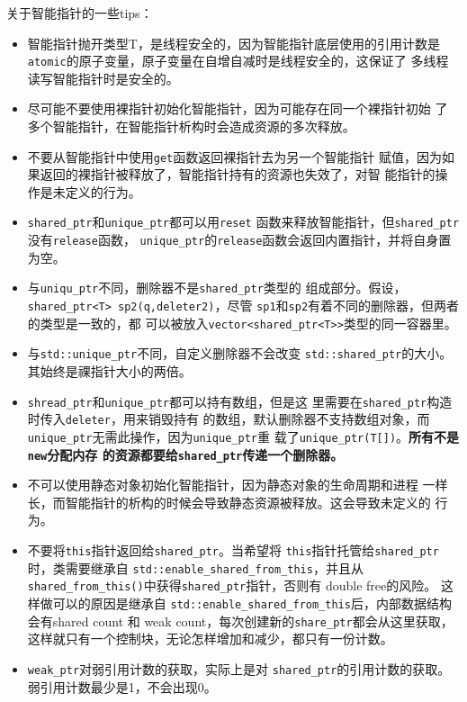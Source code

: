 关于智能指针的一些tips：
\begin{itemize}
\item 智能指针抛开类型T，是线程安全的，因为智能指针底层使用的引用计数是
\texttt{atomic}的原子变量，原子变量在自增自减时是线程安全的，这保证了
多线程读写智能指针时是安全的。
\item 尽可能不要使用裸指针初始化智能指针，因为可能存在同一个裸指针初始
  了多个智能指针，在智能指针析构时会造成资源的多次释放。
\item 不要从智能指针中使用\texttt{get}函数返回裸指针去为另一个智能指针
  赋值，因为如果返回的裸指针被释放了，智能指针持有的资源也失效了，对智
  能指针的操作是未定义的行为。
\item \texttt{shared\_ptr}和\texttt{unique\_ptr}都可以用\texttt{reset}
  函数来释放智能指针，但\texttt{shared\_ptr}没有\texttt{release}函数，
  \texttt{unique\_ptr}的\texttt{release}函数会返回内置指针，并将自身置
  为空。
\item 与\texttt{uniqu\_ptr}不同，删除器不是\texttt{shared\_ptr}类型的
  组成部分。假设，\texttt{shared\_ptr<T> sp2(q,deleter2)}，尽管
  \texttt{sp1}和\texttt{sp2}有着不同的删除器，但两者的类型是一致的，都
  可以被放入\texttt{vector<shared\_ptr<T>>}类型的同一容器里。
\item 与\texttt{std::unique\_ptr}不同，自定义删除器不会改变
  \texttt{std::shared\_ptr}的大小。其始终是祼指针大小的两倍。
\item \texttt{shread\_ptr}和\texttt{unique\_ptr}都可以持有数组，但是这
  里需要在\texttt{shared\_ptr}构造时传入\texttt{deleter}，用来销毁持有
  的数组，默认删除器不支持数组对象，而\texttt{unique\_ptr}无需此操作，因为\texttt{unique\_ptr}重
  载了\texttt{unique\_ptr(T[])}。\textbf{所有不是\texttt{new}分配内存
    的资源都要给\texttt{shared\_ptr}传递一个删除器。}
\item 不可以使用静态对象初始化智能指针，因为静态对象的生命周期和进程
  一样长，而智能指针的析构的时候会导致静态资源被释放。这会导致未定义的
  行为。
\item 不要将\texttt{this}指针返回给\texttt{shared\_ptr}。当希望将
  \texttt{this}指针托管给\texttt{shared\_ptr}时，类需要继承自
  \texttt{std::enable\_shared\_from\_this}，并且从
  \texttt{shared\_from\_this()}中获得\texttt{shared\_ptr}指针，否则有
  double free的风险。 这样做可以的原因是继承自
  \texttt{std::enable\_shared\_from\_this}后，内部数据结构会有shared
  count 和 weak count，每次创建新的\texttt{share\_ptr}都会从这里获取，
  这样就只有一个控制块，无论怎样增加和减少，都只有一份计数。
\item \texttt{weak\_ptr}对弱引用计数的获取，实际上是对
  \texttt{shared\_ptr}的引用计数的获取。弱引用计数最少是1，不会出现0。
\end{itemize}

